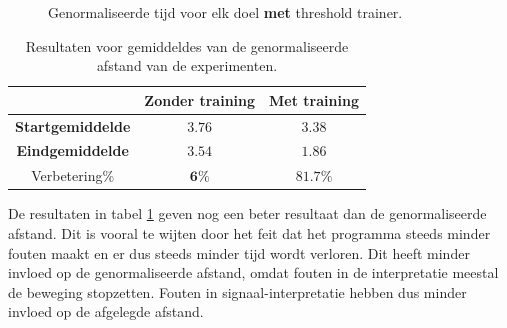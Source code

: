 \documentclass{article}
\newcommand{\figwidth}{0.82\linewidth}
\begin{document}
\begin{figure}[H]
	\centering
	\caption{Genormaliseerde tijd voor elk doel \textbf{met} threshold trainer.}
	\label{fig:restimewt}
	
\end{figure}

\begin{table}[H]
	\begin{tabular}{|c|c|c|}
		\hline  & \textbf{Zonder training} & \textbf{Met training} \\ 
		\hline \textbf{Startgemiddelde} & $3.76$ & $3.38$ \\ 
		\hline \textbf{Eindgemiddelde} & $3.54$ & $1.86$ \\ 
		\hline Verbetering\% & $\mathbf{6}\%$ & $\mathbf{81.7}\%$\\
		\hline
	\end{tabular} 
	\caption{Resultaten voor gemiddeldes van de genormaliseerde afstand van de experimenten.}
	\label{tbl:resgemiddeldestijd}
\end{table}
De resultaten in tabel \ref{tbl:resgemiddeldestijd} geven nog een beter resultaat dan de genormaliseerde afstand. Dit is vooral te wijten door het feit dat het programma steeds minder fouten maakt en er dus steeds minder tijd wordt verloren. Dit heeft minder invloed op de genormaliseerde afstand, omdat fouten in de interpretatie meestal de beweging stopzetten. Fouten in signaal-interpretatie hebben dus minder invloed op de afgelegde afstand.\\
\end{document}
